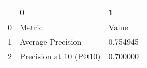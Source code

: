 \begin{tabular}{lll}
\toprule
 & 0 & 1 \\
\midrule
0 & Metric & Value \\
1 & Average Precision & 0.754945 \\
2 & Precision at 10 (P@10) & 0.700000 \\
\bottomrule
\end{tabular}
